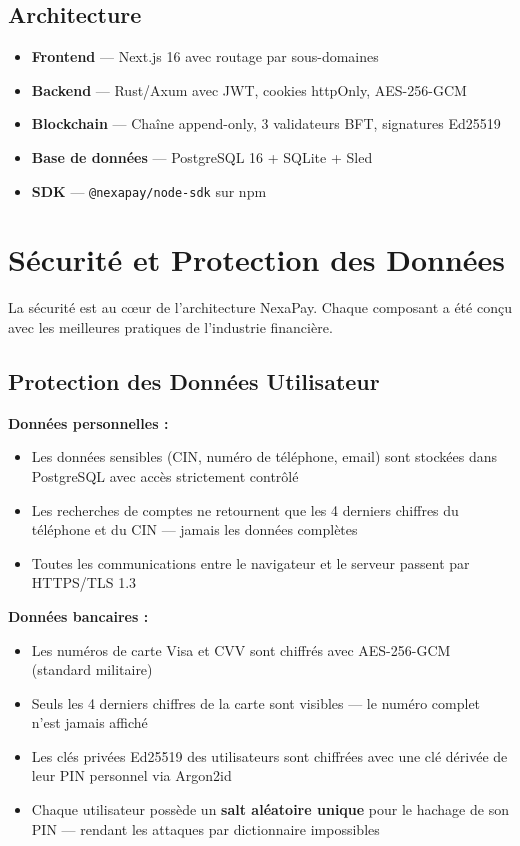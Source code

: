 \documentclass[11pt,a4paper]{article}
\begin{document}
\subsection{Architecture}

\begin{itemize}[leftmargin=*]
    \item \textbf{Frontend} --- Next.js 16 avec routage par sous-domaines
    \item \textbf{Backend} --- Rust/Axum avec JWT, cookies httpOnly, AES-256-GCM
    \item \textbf{Blockchain} --- Cha\^ine append-only, 3 validateurs BFT, signatures Ed25519
    \item \textbf{Base de donn\'ees} --- PostgreSQL 16 + SQLite + Sled
    \item \textbf{SDK} --- \texttt{@nexapay/node-sdk} sur npm
\end{itemize}

\newpage

\section{S\'ecurit\'e et Protection des Donn\'ees}

La s\'ecurit\'e est au c\oe{}ur de l'architecture NexaPay. Chaque composant a \'et\'e con\c{c}u avec les meilleures pratiques de l'industrie financi\`ere.

\subsection{Protection des Donn\'ees Utilisateur}

\textbf{Donn\'ees personnelles :}
\begin{itemize}[leftmargin=*]
    \item Les donn\'ees sensibles (CIN, num\'ero de t\'el\'ephone, email) sont stock\'ees dans PostgreSQL avec acc\`es strictement contr\^ol\'e
    \item Les recherches de comptes ne retournent que les 4 derniers chiffres du t\'el\'ephone et du CIN --- jamais les donn\'ees compl\`etes
    \item Toutes les communications entre le navigateur et le serveur passent par HTTPS/TLS 1.3
\end{itemize}

\textbf{Donn\'ees bancaires :}
\begin{itemize}[leftmargin=*]
    \item Les num\'eros de carte Visa et CVV sont chiffr\'es avec AES-256-GCM (standard militaire)
    \item Seuls les 4 derniers chiffres de la carte sont visibles --- le num\'ero complet n'est jamais affich\'e
    \item Les cl\'es priv\'ees Ed25519 des utilisateurs sont chiffr\'ees avec une cl\'e d\'eriv\'ee de leur PIN personnel via Argon2id
    \item Chaque utilisateur poss\`ede un \textbf{salt al\'eatoire unique} pour le hachage de son PIN --- rendant les attaques par dictionnaire impossibles
\end{itemize}
\end{document}
